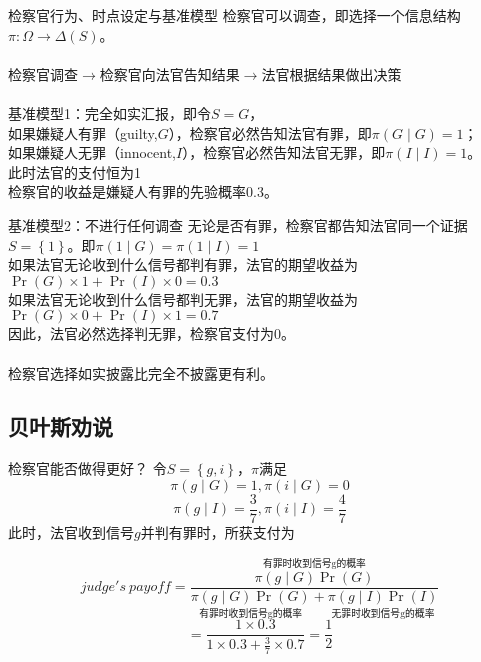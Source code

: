 \documentclass{beamer}
\begin{document}
\begin{frame}{检察官行为、时点设定与基准模型}
	检察官可以调查，即选择一个信息结构$\pi: \Omega\to\Delta\left(S\right)$。\\~\\
	检察官调查$\to$检察官向法官告知结果$\to$法官根据结果做出决策\\~\\
	基准模型1：完全如实汇报，即令$S=G$，\\
	如果嫌疑人有罪（guilty,$ G $），检察官必然告知法官有罪，即$\pi\left(G\mid G\right)=1$；\\
	如果嫌疑人无罪（innocent,$ I $），检察官必然告知法官无罪，即$\pi\left(I\mid I\right)=1$。\\
	此时法官的支付恒为1\\
	检察官的收益是嫌疑人有罪的先验概率0.3。
\end{frame}

\begin{frame}{基准模型2：不进行任何调查}
	无论是否有罪，检察官都告知法官同一个证据$S=\left\lbrace 1\right\rbrace $。即$\pi\left(1\mid G\right)=\pi\left(1\mid I\right)=1$\\
	如果法官无论收到什么信号都判有罪，法官的期望收益为\\
	$\Pr(G)\times1+\Pr(I)\times0=0.3$\\
	如果法官无论收到什么信号都判无罪，法官的期望收益为\\
	$\Pr(G)\times0+\Pr(I)\times1=0.7$\\\pause
	因此，法官必然选择判无罪，检察官支付为0。\pause\\~\\
	检察官选择如实披露比完全不披露更有利。
\end{frame}

\subsection{贝叶斯劝说}

\begin{frame}{检察官能否做得更好？}
	令$S=\left\lbrace g,i\right\rbrace $，$\pi$满足
	$$\pi\left( g\mid G \right)=1, \pi\left( i\mid G \right)=0$$
	$$\pi\left( g\mid I \right)=\frac{3}{7}, \pi\left( i\mid I \right)=\frac{4}{7}$$\pause
	此时，法官收到信号$g$并判有罪时，所获支付为\pause

	$$judge's \ payoff=\frac{\overset{\text{有罪时收到信号g的概率}}{\pi\left( g \mid G\right) \Pr\left( G\right)} }{\underset{\text{有罪时收到信号g的概率}}{\pi\left( g \mid G\right) \Pr\left( G\right)}+\underset{\text{无罪时收到信号g的概率}}{\pi\left( g \mid I\right) \Pr\left( I\right)}}$$\pause
	$$=\frac{1\times0.3}{1\times 0.3+\frac{3}{7}\times 0.7}=\frac{1}{2}$$
\end{frame}
\end{document}
